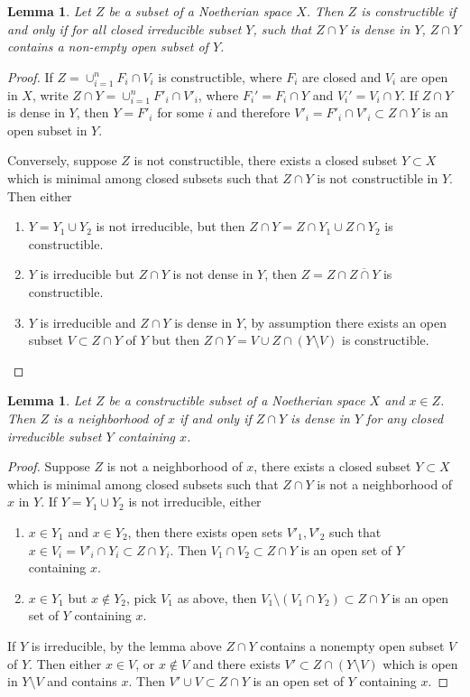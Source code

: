 \documentclass[leqno]{amsart}
\newcommand{\1}{\mathbf{1}}
\newtheorem{lem}[thm]{Lemma}
\theoremstyle{definition}
\theoremstyle{remark}
\begin{document}
\begin{lem}
	Let $Z$ be a subset of a Noetherian space  $X$.
	Then $Z$ is constructible if and only if 
	for all closed irreducible subset $Y$,
	such that $Z\cap Y$ is dense in $Y$,
	$Z\cap Y$ contains 
	a non-empty open subset of  $Y$.
\end{lem}
\begin{proof}
	If $Z=\cup_{i=1}^nF_i\cap V_i$ is constructible,
	where $F_i$ are closed and $V_i$ are open in $X$,
	write $Z\cap Y=\cup_{i=1}^nF'_i\cap V'_i$,
	where $F_i'=F_i\cap Y$ and  $V_i'=V_i\cap Y$.
	If $Z\cap Y$ is dense in $Y$,
	then  $Y=F'_i$ for some  $i$ and therefore
	$V'_i=F'_i\cap V'_i\subset Z\cap Y$
	is an open subset in  $Y$.

	Conversely,
	suppose $Z$ is not constructible,
	there exists a closed subset $Y\subset X$ which is
	minimal among closed subsets such that 
	$Z\cap Y$ is not constructible in $Y$.
	Then either
	\begin{enumerate}
		\item $Y=Y_1\cup Y_2$ is not irreducible,
		but then  $Z\cap Y=Z\cap Y_1\cup Z\cap Y_2$
		is constructible.
		\item  $Y$ is irreducible but  
		$Z\cap Y$ is not dense in  $Y$,
		then $Z=Z\cap \overline{Z\cap Y}$ is constructible.
		\item $Y$ is irreducible and 
		$Z\cap Y$ is dense in  $Y$,
		by assumption there exists an open subset 
		$V\subset Z\cap Y$ of $Y$
		but then $Z\cap Y=V\cup Z\cap (Y\setminus V)$
		is constructible.
	\end{enumerate}
\end{proof}
\begin{lem}
	Let $Z$ be a constructible subset 
	of a Noetherian space  $X$ and $x\in Z$.
	Then  $Z$ is a neighborhood of $x$
	if and only if $Z\cap Y$ is dense in  $Y$
	for any closed irreducible subset  $Y$
	containing  $x$.
\end{lem}
\begin{proof}
	Suppose $Z$ is not a neighborhood of  $x$,
	there exists a closed subset $Y\subset X$
	which is minimal among closed subsets such that
	$Z\cap Y$ is not a neighborhood of  $x$ in  $Y$.
	If $Y=Y_1\cup Y_2$ is not irreducible, either
	\begin{enumerate}
	\item $x\in Y_1$ and $x\in Y_2$,
	then there exists open sets $V'_1,V'_2$
	such that $x\in V_i=V'_i\cap Y_i\subset Z\cap Y_i$.
	Then $V_1\cap V_2\subset Z\cap Y$
	is an open set of $Y$ containing  $x$.
	\item  $x\in Y_1$ but $x\notin Y_2$,
	pick $V_1$ as above,
	then $V_1\setminus (V_1\cap Y_2)\subset Z\cap Y$
	is an open set of $Y$ containing  $x$.
	\end{enumerate}
	If $Y$ is irreducible, by the lemma above
	$Z\cap Y$ contains a nonempty open subset $V$ of $Y$.
	Then either $x\in V$,
	or  $x\notin V$
	and there exists  $V'\subset Z\cap (Y\setminus V)$
	which is open in  $Y\setminus V$ and contains $x$. 
	Then $V'\cup V\subset Z\cap Y$
	is an open set of $Y$ containing  $x$.
\end{proof}
	
\end{document}
